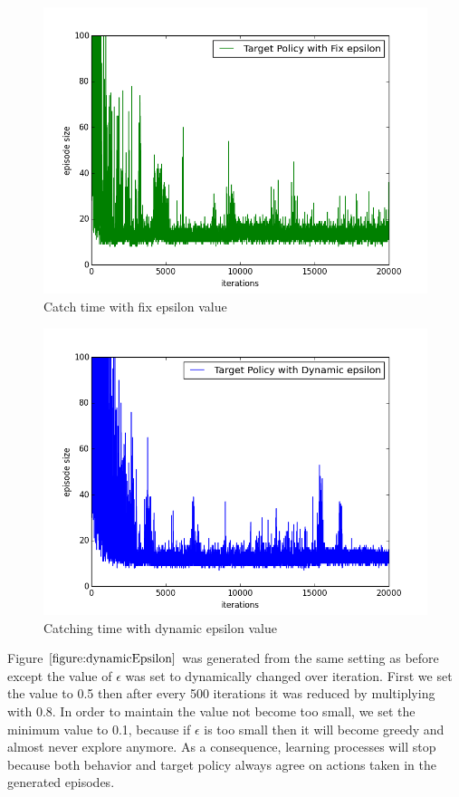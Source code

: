 \documentclass[paper=a4, fontsize=11pt]{scrartcl}
\numberwithin{equation}{section}		%
\numberwithin{figure}{section}			%
\numberwithin{table}{section}				%
\begin{document}
\begin{figure}[H] \centering
\includegraphics[scale=0.5]{target_fix_0_1.png}
\caption{Catch time with fix epsilon value} \label{figure:fixEpsilon}
\end{figure}

\begin{figure}[H] \centering
\includegraphics[scale=0.5]{target_dynamic_0_5_0_8_0_05.png}
\caption{Catching time with dynamic epsilon value}\label{figure:dynamicEpsilon} \label{figure:dynamicEpsilon}
\end{figure}

Figure $\ref{figure:dynamicEpsilon}$ was generated from the same setting as before except the value of $\epsilon$ was set to dynamically changed over iteration. First we set the value to 0.5 then after every 500 iterations it was reduced by multiplying with 0.8. In order to maintain the value not become too small, we set the minimum value to 0.1, because if $\epsilon$ is too small then it will become greedy and almost never explore anymore. As a consequence, learning processes will stop because both behavior and target policy always agree on actions taken in the generated episodes.
\end{document}
